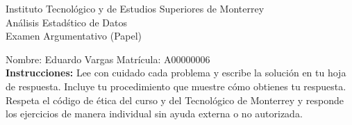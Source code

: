 \documentclass[10pt]{report}
\begin{document}
\newpage



\begin{center}
{\large Instituto Tecnol\'{o}gico y de Estudios Superiores de Monterrey \\
An\'alisis Estad\'stico de Datos } \\
Examen Argumentativo (Papel)
\end{center}

Nombre: \underline{\hspace*{.2in}}
Eduardo Vargas
\underline{\hspace*{.2in}} \quad Matr\'icula:\underline{\hspace*{.2in}}
A00000006
\underline{\hspace*{.2in}} \\

{\bf Instrucciones:} Lee con cuidado cada problema y escribe la soluci\'on
en tu hoja de respuesta. Incluye tu procedimiento que muestre c\'omo obtienes tu respuesta.  Respeta el c\'odigo de \'etica del curso y del Tecnol\'ogico de Monterrey y responde los ejercicios de manera individual sin ayuda externa o no autorizada.
\end{document}
